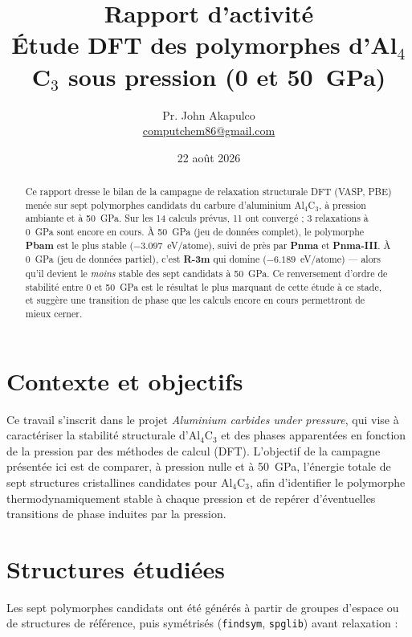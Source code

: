 \documentclass[11pt,a4paper]{article}
\title{\vspace{-1.5cm}Rapport d'activité\\[2pt]
\large Étude DFT des polymorphes d'Al$_4$C$_3$ sous pression (0 et 50~GPa)}
\author{Pr. John Akapulco \\ \small \href{mailto:computchem86@gmail.com}{computchem86@gmail.com}}
\date{22 août 2026}
\begin{document}
\maketitle
\vspace{-0.5cm}

\begin{abstract}
\noindent
Ce rapport dresse le bilan de la campagne de relaxation structurale DFT (VASP, PBE) menée sur
sept polymorphes candidats du carbure d'aluminium Al$_4$C$_3$, à pression ambiante et à
50~GPa. Sur les 14 calculs prévus, 11 ont convergé ; 3 relaxations à 0~GPa sont encore en
cours. À 50~GPa (jeu de données complet), le polymorphe \textbf{Pbam} est le plus stable
($-3.097$~eV/atome), suivi de près par \textbf{Pnma} et \textbf{Pnma-III}. À 0~GPa (jeu de
données partiel), c'est \textbf{R-3m} qui domine ($-6.189$~eV/atome) — alors qu'il devient le
\emph{moins} stable des sept candidats à 50~GPa. Ce renversement d'ordre de stabilité entre 0
et 50~GPa est le résultat le plus marquant de cette étude à ce stade, et suggère une
transition de phase que les calculs encore en cours permettront de mieux cerner.
\end{abstract}

\section{Contexte et objectifs}

Ce travail s'inscrit dans le projet \emph{Aluminium carbides under pressure}, qui vise à
caractériser la stabilité structurale d'Al$_4$C$_3$ et des phases apparentées en fonction de
la pression par des méthodes de calcul (DFT). L'objectif de la campagne présentée ici est de
comparer, à pression nulle et à 50~GPa, l'énergie totale de sept structures cristallines
candidates pour Al$_4$C$_3$, afin d'identifier le polymorphe thermodynamiquement stable à
chaque pression et de repérer d'éventuelles transitions de phase induites par la pression.

\section{Structures étudiées}

Les sept polymorphes candidats ont été générés à partir de groupes d'espace ou de structures
de référence, puis symétrisés (\texttt{findsym}, \texttt{spglib}) avant relaxation :
\end{document}

